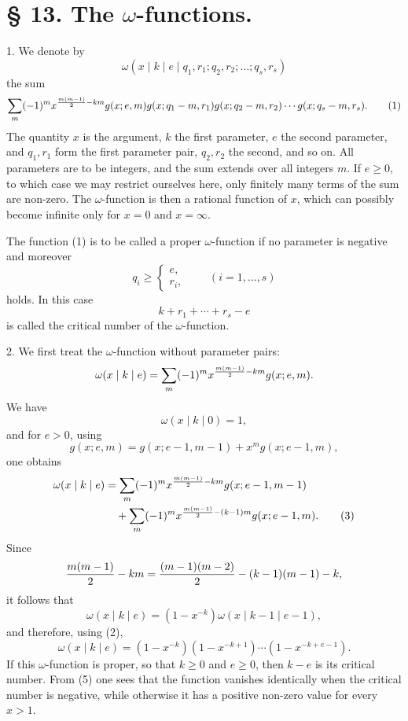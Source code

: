 \documentclass[11pt,a4paper]{article}
\begin{document}
\section*{§ 13. The $\omega$-functions.}

1. We denote by
\[
 \omega(x\mid k\mid e\mid q_1,r_1;q_2,r_2;\ldots;q_s,r_s)
\]
the sum
\begin{equation}
 \sum_m(-1)^m x^{{m(m-1)\over2}-km}
 g(x;e,m)g(x;q_1-m,r_1)g(x;q_2-m,r_2)\cdots g(x;q_s-m,r_s).
\tag{1}
\end{equation}
The quantity $x$ is the argument, $k$ the first parameter, $e$ the second parameter, and $q_1,r_1$ form the first parameter pair, $q_2,r_2$ the second, and so on. All parameters are to be integers, and the sum extends over all integers $m$. If $e\ge0$, to which case we may restrict ourselves here, only finitely many terms of the sum are non-zero. The $\omega$-function is then a rational function of $x$, which can possibly become infinite only for $x=0$ and $x=\infty$.

The function (1) is to be called a proper $\omega$-function if no parameter is negative and moreover
\[
 q_i\ge \begin{cases}e,\\ r_i,
 \end{cases}\qquad(i=1,\ldots,s)
\]
holds. In this case
\[
 k+r_1+\cdots+r_s-e
\]
is called the critical number of the $\omega$-function.

2. We first treat the $\omega$-function without parameter pairs:
\[
 \omega(x\mid k\mid e)=\sum_m(-1)^m x^{{m(m-1)\over2}-km}g(x;e,m).
\]
We have
\begin{equation}
 \omega(x\mid k\mid0)=1,
\tag{2}
\end{equation}
and for $e>0$, using
\[
 g(x;e,m)=g(x;e-1,m-1)+x^m g(x;e-1,m),
\]
one obtains
\begin{align}
\omega(x\mid k\mid e)
&=\sum_m(-1)^m x^{{m(m-1)\over2}-km}g(x;e-1,m-1)\notag\\
&\quad+\sum_m(-1)^m x^{{m(m-1)\over2}-(k-1)m}g(x;e-1,m).
\tag{3}
\end{align}
Since
\[
 {m(m-1)\over2}-km={(m-1)(m-2)\over2}-(k-1)(m-1)-k,
\]
it follows that
\begin{equation}
 \omega(x\mid k\mid e)=(1-x^{-k})\omega(x\mid k-1\mid e-1),
\tag{4}
\end{equation}
and therefore, using (2),
\begin{equation}
 \omega(x\mid k\mid e)=(1-x^{-k})(1-x^{-k+1})\cdots(1-x^{-k+e-1}).
\tag{5}
\end{equation}
If this $\omega$-function is proper, so that $k\ge0$ and $e\ge0$, then $k-e$ is its critical number. From (5) one sees that the function vanishes identically when the critical number is negative, while otherwise it has a positive non-zero value for every $x>1$.
\end{document}
